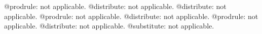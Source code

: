 \documentclass[11pt]{article}
\begin{document}
@prodrule: not applicable.
@distribute: not applicable.
@distribute: not applicable.
@prodrule: not applicable.
@distribute: not applicable.
@prodrule: not applicable.
@distribute: not applicable.
@substitute: not applicable.
\end{document}
